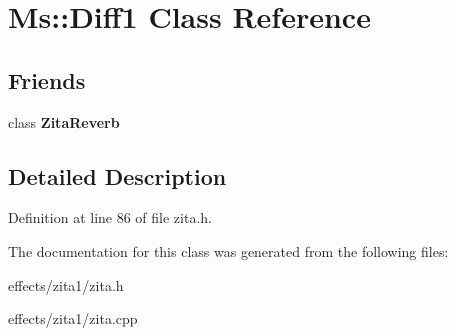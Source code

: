 \hypertarget{class_ms_1_1_diff1}{}\section{Ms\+:\+:Diff1 Class Reference}
\label{class_ms_1_1_diff1}
\subsection*{Friends}
\begin{DoxyCompactItemize}
\item 
\mbox{\label{class_ms_1_1_diff1_a174ebfd5ad2853d19b5ec49485b195f0}} 
class {\bfseries Zita\+Reverb}
\end{DoxyCompactItemize}


\subsection{Detailed Description}


Definition at line 86 of file zita.\+h.



The documentation for this class was generated from the following files\+:\begin{DoxyCompactItemize}
\item 
effects/zita1/zita.\+h\item 
effects/zita1/zita.\+cpp\end{DoxyCompactItemize}
